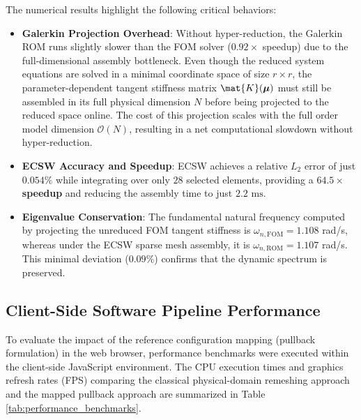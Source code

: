The numerical results highlight the following critical behaviors:
\begin{itemize}
        \item \textbf{Galerkin Projection Overhead}: Without hyper-reduction, the Galerkin ROM runs slightly slower than the FOM solver ($0.92\times$ speedup) due to the full-dimensional assembly bottleneck. Even though the reduced system equations are solved in a minimal coordinate space of size $r \times r$, the parameter-dependent tangent stiffness matrix $\mat{K}(\boldsymbol{\mu})$ must still be assembled in its full physical dimension $N$ before being projected to the reduced space online. The cost of this projection scales with the full order model dimension $\mathcal{O}(N)$, resulting in a net computational slowdown without hyper-reduction.
        \item \textbf{ECSW Accuracy and Speedup}: ECSW achieves a relative $L_2$ error of just $0.054\%$ while integrating over only $28$ selected elements, providing a \textbf{$64.5\times$ speedup} and reducing the assembly time to just $2.2\text{ ms}$.
        \item \textbf{Eigenvalue Conservation}: The fundamental natural frequency computed by projecting the unreduced FOM tangent stiffness is $\omega_{n,\text{FOM}} = 1.108$ rad/s, whereas under the ECSW sparse mesh assembly, it is $\omega_{n,\text{ROM}} = 1.107$ rad/s. This minimal deviation ($0.09\%$) confirms that the dynamic spectrum is preserved.
\end{itemize}

\subsection{Client-Side Software Pipeline Performance}
To evaluate the impact of the reference configuration mapping (pullback formulation) in the web browser, performance benchmarks were executed within the client-side JavaScript environment. The CPU execution times and graphics refresh rates (FPS) comparing the classical physical-domain remeshing approach and the mapped pullback approach are summarized in Table \ref{tab:performance_benchmarks}.

